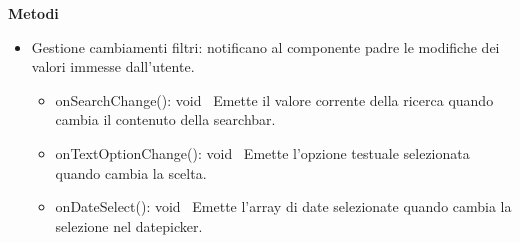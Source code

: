 \documentclass[a4paper,11pt]{article}
\begin{document}
\textbf{Metodi}
\begin{itemize}[noitemsep, topsep=0pt]
  \item Gestione cambiamenti filtri: notificano al componente padre le modifiche dei valori immesse dall'utente.
  \begin{itemize}[noitemsep, topsep=0pt]
    \item onSearchChange(): void \
    Emette il valore corrente della ricerca quando cambia il contenuto della searchbar.

    \item onTextOptionChange(): void \
    Emette l'opzione testuale selezionata quando cambia la scelta.

    \item onDateSelect(): void \
    Emette l'array di date selezionate quando cambia la selezione nel datepicker.
  \end{itemize}
\end{itemize}
\end{document}
